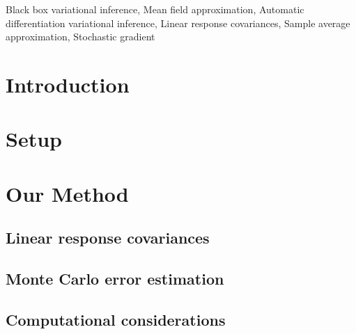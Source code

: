 \documentclass[twoside,11pt]{article}
\begin{document}
\begin{keywords}
    Black box variational inference,
    Mean field approximation,
    Automatic differentiation variational inference,
    Linear response covariances,
    Sample average approximation,
    Stochastic gradient
\end{keywords}

\section{Introduction}\label{sec:intro}


% 


\section{Setup} \label{sec:setup}



\section{Our Method}\label{sec:dadvi}%


\subsection{Linear response covariances}\label{sec:linear_response}


\subsection{Monte Carlo error
estimation}\label{sec:mc_error_estimation}


\subsection{Computational considerations}
\label{sec:lr_mc_computation} 

\end{document}

